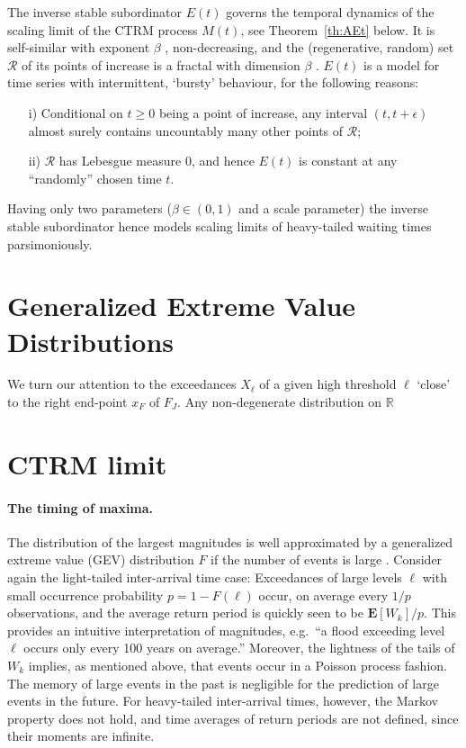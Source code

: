 \documentclass[12pt]{article}
\theoremstyle{definition}
\theoremstyle{remark}
\numberwithin{equation}{section}
\newcommand{\ex}{\mathbf {E}}
\newcommand{\R}{\mathbb R}
\newcommand{\1}{\mathbf 1}
\begin{document}
The inverse stable subordinator $E(t)$ governs the temporal dynamics of
the scaling limit of the CTRM process $M(t)$, see Theorem~\ref{th:AEt} below. 
It is self-similar with exponent $\beta$
\cite{limitCTRW}, non-decreasing, and the (regenerative, random) set 
$\mathcal R$ of its points of increase is a fractal with dimension $\beta$ 
\cite{Bertoin04}.
$E(t)$ is a model for time series with intermittent, `bursty'
behaviour, for the following reasons:
\begin{itemize}
\item [i)]
Conditional on $t \ge 0$ being a point of increase, any interval 
$(t, t+ \epsilon)$ almost surely contains uncountably many other points of 
$\mathcal R$; 
\item [ii)]
$\mathcal R$ has Lebesgue measure $0$, and hence $E(t)$ is
constant at any ``randomly'' chosen time $t$. 
\end{itemize}
Having only two parameters ($\beta \in (0,1)$ and a scale parameter)
the inverse stable subordinator hence models scaling limits of heavy-tailed 
waiting times parsimoniously.

\section{Generalized Extreme Value Distributions}

We turn our attention to the exceedances $X_\ell$ of a given high threshold
$\ell$ `close' to the right end-point $x_F$ of $F_J$. 
Any non-degenerate distribution on $\R$

\section{CTRM limit}

\paragraph*{The timing of maxima.}
The distribution of the largest magnitudes is well approximated by a 
generalized extreme value (GEV) distribution $F$ if the number of events is 
large \cite{ColesBook}.
Consider again the light-tailed inter-arrival time case: 
Exceedances of large levels $\ell$ with small occurrence probability
$p = 1 - F(\ell)$ occur, on average every $1/p$ observations, and the average
return period is quickly seen to be $\ex[W_k]/p$.
This provides an intuitive interpretation of magnitudes, e.g.\ ``a flood
exceeding level $\ell$ occurs only every 100 years on average.'' 
Moreover, the lightness of the tails of $W_k$ implies, as mentioned above,
that events occur in a Poisson process fashion.  The memory of large events
in the past is negligible for the prediction of large events in the future.
For heavy-tailed inter-arrival times, however, the Markov property does not
hold, and time averages of return periods are not defined, since their moments
are infinite.  
\end{document}
